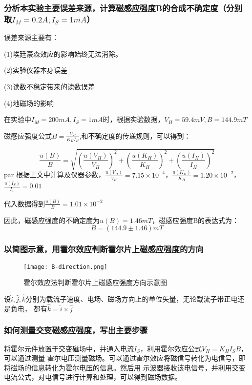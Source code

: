 \documentclass[12pt,a4paper]{article}
\begin{document}
        \subsubsection{分析本实验主要误差来源，计算磁感应强度B的合成不确定度（分别取$I_M=0.2A,I_S=1mA$）}
        误差来源主要有：\par
        (1)埃廷豪森效应的影响始终无法消除。\par
        (2)实验仪器本身误差\par
        (3)读数不稳定带来的读数误差\par
        (4)地磁场的影响\par
        在实验中$I_M=200mA,I_S=1mA$时，根据实验数据，$V_H=59.4mV,B=144.9mT$\par
        磁感应强度公式$B=\frac{U_H}{{K_H}I_H}$,和不确定度的传递规则，可以得到：\par
        \[\frac{{u\left( B \right)}}{B} = \sqrt {{{\left( {\frac{{u\left( {{V_H}} \right)}}{{{V_H}}}} \right)}^2} + {{\left( {\frac{{u\left( {{K_H}} \right)}}{{{K_H}}}} \right)}^2} + {{\left( {\frac{{u\left( {{I_H}} \right)}}{{{I_H}}}} \right)}^2}} \]par
        根据上文中计算及仪器参数，$\frac{{u\left( {{V_H}} \right)}}{{{V_H}}} = 7.15 \times {10^{ - 4}}$，$\frac{{u\left( {{K_H}} \right)}}{{{K_H}}} = 1.20 \times {10^{ - 2}}$，
        $\frac{{u\left( {{I_S}} \right)}}{{{I_S}}} = 0.01$\par
        代入数据得到$\frac{{u\left( B \right)}}{B} = 1.01 \times {10^{ - 2}}$\par
        因此，磁感应强度的不确定度为$u(B)=1.46mT$，磁感应强度B的表达式为：
        \[B = \left( {144.9 \pm 1.46} \right)mT\]

        \subsubsection{以简图示意，用霍尔效应判断霍尔片上磁感应强度的方向}
        \begin{figure}[H]
            \centering
            \texttt{[image: B-direction.png]}
            \caption*{霍尔效应法判断霍尔片上磁感应强度方向示意图}
        \end{figure}
        设$\hat i,\hat j,\hat k$分别为载流子速度、电场、磁场方向上的单位矢量，无论载流子带正电还是负电，
        都有$\hat k = \hat i \times \hat j$

        \subsubsection{如何测量交变磁感应强度，写出主要步骤}
        将霍尔元件放置于交变磁场中，并通入电流$I_S$，利用霍尔效应公式$V_H={K_H}{I_S}B$，可以通过测量
        霍尔电压测量磁场。可以通过霍尔效应将磁信号转化为电信号，即将磁场的信息转化为霍尔电压的信息。然后用
        示波器接收该电信号，并利用交变电流公式，对电信号进行计算和处理，可以得到磁场数据。
\end{document}
